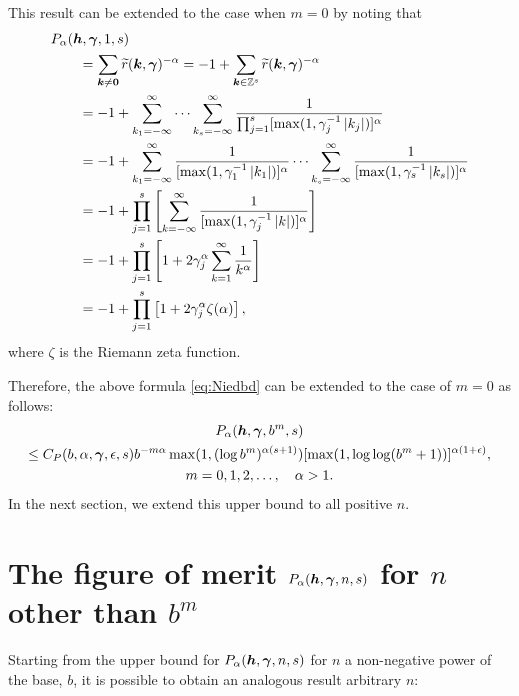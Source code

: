 \documentclass[authoryear]{elsarticle}
\newcommand{\tr}{\widetilde{r}}
\begin{document}
This result can be extended to the case when $m = 0$ by noting that
\begin{align*}
    \MoveEqLeft{P_{\alpha}(\vh,\vgamma,1,s)} \\
    & = \sum_{\vk \ne \vzero} \tr(\vk, \vgamma)^{-\alpha} = -1 + \sum_{\vk \in \integers^s} \tr(\vk,\vgamma)^{-\alpha} \\
    & = -1 + \sum_{k_1 =-\infty}^{\infty} \cdots \sum_{k_s  =-\infty}^{\infty} \frac{1}{\prod_{j=1}^s[\max(1,\gamma_j^{-1}\abs{k_j})]^\alpha} \\
    & = -1 + \sum_{k_1 =-\infty}^{\infty} \frac{1}{[\max(1,\gamma_1^{-1}\abs{k_1})]^\alpha} \cdots \sum_{k_s  =-\infty}^{\infty} \frac{1}{[\max(1,\gamma_s^{-1}\abs{k_s})]^\alpha} \\
    & = -1 + \prod_{j=1}^s \left[\sum_{k =-\infty}^{\infty} \frac{1}{[\max(1,\gamma_j^{-1}\abs{k})]^\alpha} \right] \\
    & = -1 + \prod_{j=1}^s \left[1 + 2 \gamma_j^{\alpha} \sum_{k =1}^{\infty} \frac{1}{k^\alpha} \right]\\
    & = -1 +  \prod_{j=1}^s \left[1 + 2 \gamma_j^{\alpha}\zeta(\alpha) \right],
\end{align*}
where $\zeta$ is the Riemann zeta function.

Therefore, the above formula \eqref{eq:Niedbd} can be extended to the case of $m=0$ as follows:
\begin{multline} \label{eq:Palphaextm}
    P_{\alpha}(\boldsymbol{h},\boldsymbol{\gamma},b^m,s) \\
    \le C_{P}(b,\alpha,\boldsymbol{\gamma},\epsilon,s)
    b^{-m\alpha}\max(1, (\log b^{m})^{\alpha(s+1)})[\max(1,\log \log (
    b^m+1))]^{\alpha(1+\epsilon)}, \\ m =0, 1, 2,\ldots, \quad \alpha > 1.
\end{multline} 
In the next section, we extend this upper bound to all positive $n$. 

\section{The figure of merit $P_{\alpha}(\boldsymbol{h},\boldsymbol{\gamma},n,s)$ for  $n$ other than $b^m$} \label{sec:Palphabd}
Starting from the upper bound for $P_{\alpha}(\boldsymbol{h},\boldsymbol{\gamma},n,s)$ for $n$ a non-negative power of the base, $b$, it is possible to obtain an analogous result arbitrary $n$: 
\end{document}
